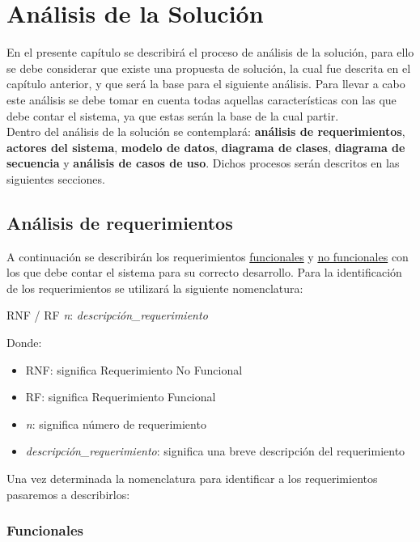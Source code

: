 \hypertarget{cv:analisisSol
	ucion}{
	\chapter{Análisis de la Solución}
}

En el presente capítulo se describirá el proceso de análisis de la solución, para ello se debe considerar que existe una propuesta de solución, la cual fue descrita en el capítulo anterior, y que será la base para el siguiente análisis. Para llevar a cabo este análisis se debe tomar en cuenta todas aquellas características con las que debe contar el sistema, ya que estas serán la base de la cual partir. \\ 

Dentro del análisis de la solución se contemplará: \textbf{análisis de requerimientos}, \textbf{actores del sistema}, \textbf{modelo de datos}, \textbf{diagrama de clases}, \textbf{diagrama de secuencia} y \textbf{análisis de casos de uso}. Dichos procesos serán descritos en las siguientes secciones.

\section{Análisis de requerimientos}
A continuación se describirán los requerimientos \hyperlink{cv:funcionales}{funcionales} y \hyperlink{cv:noFuncionales}{no funcionales} con los que debe contar el sistema para su correcto desarrollo. Para la identificación de los requerimientos se utilizará la siguiente nomenclatura: 

\begin{center}
\Large{RNF / RF \textit{n}: \textit{descripción\_requerimiento}}
\end{center} 

Donde: 

\begin{itemize}
	\item RNF: significa Requerimiento No Funcional
	\item RF: significa Requerimiento Funcional
	\item \textit{n}: significa número de requerimiento
	\item \textit{descripción\_requerimiento}: significa una breve descripción del requerimiento
\end{itemize}

Una vez determinada la nomenclatura para identificar a los requerimientos pasaremos a describirlos: 
\hypertarget{cv:funcionales}{\subsection{Funcionales}}

